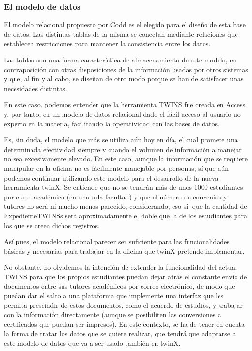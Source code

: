 \subsubsection{El modelo de datos}
\label{ModeloDatos}

El modelo relacional propuesto por Codd es el elegido para el diseño de esta base de datos. Las distintas tablas de la misma se conectan mediante relaciones que establecen restricciones para mantener la consistencia entre los datos.

Las tablas son una forma característica de almacenamiento de este modelo, en contraposición con otras disposiciones de la información usadas por otros sistemas y que, al fin y al cabo, se diseñan de otro modo porque se han de satisfacer unas necesidades distintas.

En este caso, podemos entender que la herramienta TWINS fue creada en Access y, por tanto, en un modelo de datos relacional dado el fácil acceso al usuario no experto en la materia, facilitando la operatividad con las bases de datos.

Es, sin duda, el modelo que más se utiliza aún hoy en día, el cual promete una determinada efectividad siempre y cuando el volumen de información a manejar no sea excesivamente elevado. En este caso, aunque la información que se requiere manipular en la oficina no es fácilmente manejable por personas, sí que aún podemos continuar utilizando este modelo para el desarrollo de la nueva herramienta twinX. Se entiende que no se tendrán más de unos 1000 estudiantes por curso académico (en una sola facultad) y que el número de convenios y tutores no será ni mucho menos parecido, considerando, eso sí, que la cantidad de \glspl{ExpedienteTWINS} será aproximadamente el doble que la de los estudiantes para los que se creen dichos registros.

Así pues, el modelo relacional parecer ser suficiente para las funcionalidades básicas y necesarias para trabajar en la oficina que twinX pretende implementar.

No obstante, no olvidemos la intención de extender la funcionalidad del actual TWINS para que los propios estudiantes puedan dejar atrás el constante envío de documentos entre sus tutores académicos por correo electrónico, de modo que puedan dar el salto a una plataforma que implemente una interfaz que les permita prescindir de estos documentos, como el acuerdo de estudios, y trabajar con la información directamente (aunque se posibiliten las conversiones a certificados que puedan ser impresos). En este contexto, se ha de tener en cuenta la forma de tratar los datos que se quiere realizar, que tendrá que adaptarse a este modelo de datos que va a ser usado también en twinX.

